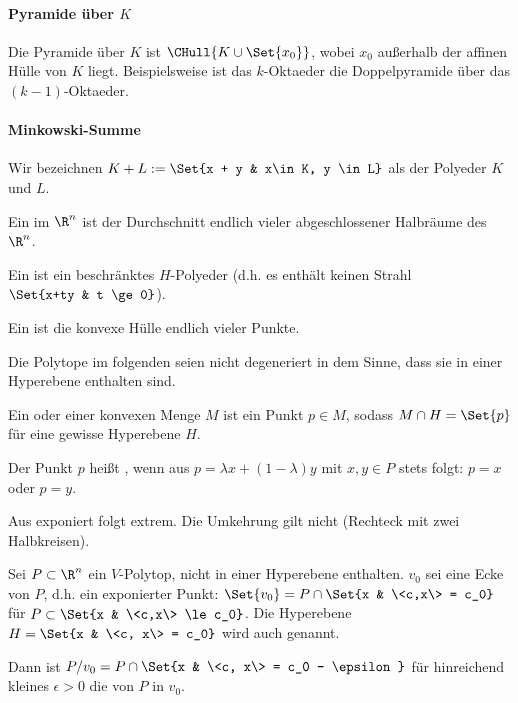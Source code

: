 \paragraph{Pyramide über $K$}
Die Pyramide über $K$ ist $\CHull{K \cup \Set{x_0}}$, wobei $x_0$ außerhalb der affinen Hülle von $K$ liegt.
Beispielsweise ist das $k$-Oktaeder die Doppelpyramide über das $(k-1)$-Oktaeder.

\paragraph{Minkowski-Summe}
Wir bezeichnen
\begin{math}
    K + L := \Set{x + y & x\in K, y \in L}
\end{math}
als  der Polyeder $K$ und $L$.

\begin{df}
    Ein  im $\R^n$ ist der Durchschnitt endlich vieler abgeschlossener Halbräume des $\R^n$.

    Ein  ist ein beschränktes $H$-Polyeder (d.h. es enthält keinen Strahl $\Set{x+ty & t \ge 0}$).
\end{df}

\begin{df}[$V$-Polytop]
    Ein  ist die konvexe Hülle endlich vieler Punkte.
\end{df}

Die Polytope im folgenden seien nicht degeneriert in dem Sinne, dass sie in einer Hyperebene enthalten sind.

\begin{df}
    Ein  oder  einer konvexen Menge $M$ ist ein Punkt $p \in M$, sodass $M \cap H = \Set{p}$ für eine gewisse Hyperebene $H$.

    Der Punkt $p$ heißt , wenn aus $p = \lambda x + (1-\lambda)y$ mit $x,y \in P$ stets folgt: $p = x$ oder $p = y$.
    \begin{note}
        Aus exponiert folgt extrem.
        Die Umkehrung gilt nicht (Rechteck mit zwei Halbkreisen).
    \end{note}
\end{df}

\begin{df}[Eckenfigur]
    Sei $P \subset \R^n$ ein $V$-Polytop, nicht in einer Hyperebene enthalten.
    $v_0$ sei eine Ecke von $P$, d.h. ein exponierter Punkt:
    \begin{math}
        \Set{v_0} =
        P \cap \Set{x & \<c,x\> = c_0}
    \end{math}
    für $P \subset \Set{x & \<c,x\> \le c_0}$.
    Die Hyperebene $H = \Set{x & \<c, x\> = c_0}$ wird auch  genannt.

    Dann ist $P / v_0 = P \cap \Set{x & \<c, x\> = c_0 - \epsilon}$ für hinreichend kleines $\epsilon > 0$ die  von $P$ in $v_0$.

\end{df}







